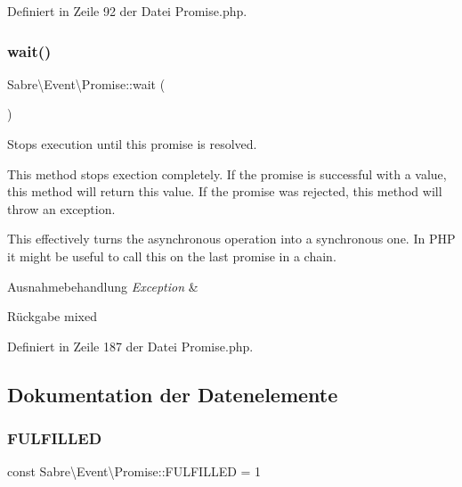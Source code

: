 Definiert in Zeile 92 der Datei Promise.\+php.

\mbox{\label{class_sabre_1_1_event_1_1_promise_aea21d20be6cc569fdd727bbd3c6b5dbc}} 
\subsubsection{\texorpdfstring{wait()}{wait()}}
{\footnotesize\ttfamily Sabre\textbackslash{}\+Event\textbackslash{}\+Promise\+::wait (\begin{DoxyParamCaption}{ }\end{DoxyParamCaption})}

Stops execution until this promise is resolved.

This method stops exection completely. If the promise is successful with a value, this method will return this value. If the promise was rejected, this method will throw an exception.

This effectively turns the asynchronous operation into a synchronous one. In P\+HP it might be useful to call this on the last promise in a chain.


\begin{DoxyExceptions}{Ausnahmebehandlung}
{\em Exception} & \\
\hline
\end{DoxyExceptions}
\begin{DoxyReturn}{Rückgabe}
mixed 
\end{DoxyReturn}


Definiert in Zeile 187 der Datei Promise.\+php.



\subsection{Dokumentation der Datenelemente}
\mbox{\label{class_sabre_1_1_event_1_1_promise_a90e3fd8afeb4ed2598f0a061476cc834}} 
\subsubsection{\texorpdfstring{F\+U\+L\+F\+I\+L\+L\+ED}{FULFILLED}}
{\footnotesize\ttfamily const Sabre\textbackslash{}\+Event\textbackslash{}\+Promise\+::\+F\+U\+L\+F\+I\+L\+L\+ED = 1}

